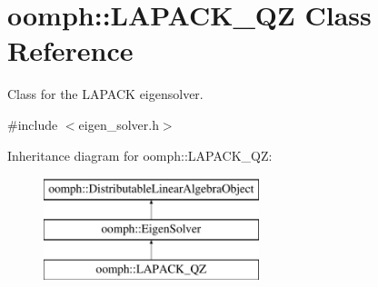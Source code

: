 \hypertarget{classoomph_1_1LAPACK__QZ}{}\section{oomph\+:\+:L\+A\+P\+A\+C\+K\+\_\+\+QZ Class Reference}
\label{classoomph_1_1LAPACK__QZ}


Class for the L\+A\+P\+A\+CK eigensolver.  




{\ttfamily \#include $<$eigen\+\_\+solver.\+h$>$}

Inheritance diagram for oomph\+:\+:L\+A\+P\+A\+C\+K\+\_\+\+QZ\+:\begin{figure}[H]
\begin{center}
\leavevmode
\includegraphics[height=3.000000cm]{classoomph_1_1LAPACK__QZ}
\end{center}
\end{figure}
